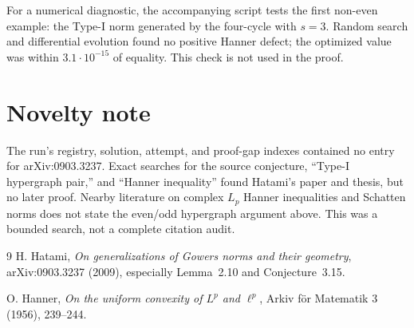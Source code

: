 \documentclass[11pt]{article}
\begin{document}
For a numerical diagnostic, the accompanying script tests the first
non-even example: the Type-I norm generated by the four-cycle with $s=3$.
Random search and differential evolution found no positive Hanner defect;
the optimized value was within $3.1\cdot10^{-15}$ of equality.  This check is
not used in the proof.

\section{Novelty note}

The run's registry, solution, attempt, and proof-gap indexes contained no
entry for arXiv:0903.3237.  Exact searches for the source conjecture,
``Type-I hypergraph pair,'' and ``Hanner inequality'' found Hatami's paper
and thesis, but no later proof.  Nearby literature on complex $L_p$ Hanner
inequalities and Schatten norms does not state the even/odd hypergraph
argument above.  This was a bounded search, not a complete citation audit.

\begin{thebibliography}{9}
H. Hatami,
\emph{On generalizations of Gowers norms and their geometry},
arXiv:0903.3237 (2009), especially Lemma~2.10 and Conjecture~3.15.

O. Hanner,
\emph{On the uniform convexity of $L^p$ and $\ell^p$},
Arkiv f\"or Matematik 3 (1956), 239--244.
\end{thebibliography}
\end{document}
